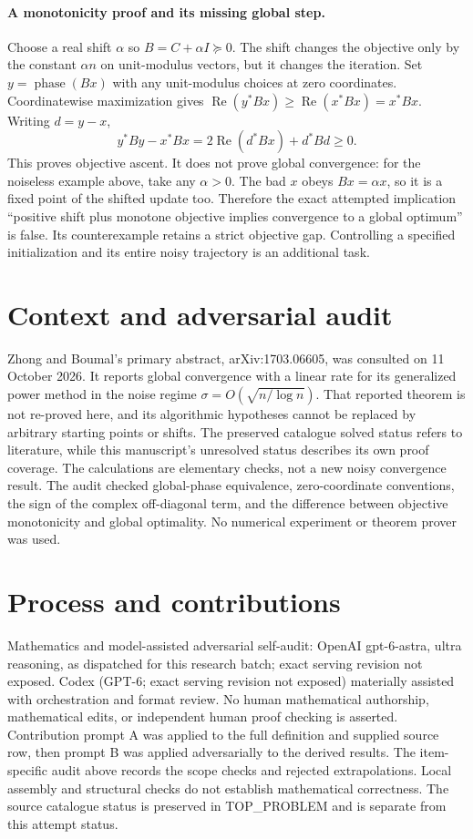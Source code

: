 \documentclass[11pt]{article}
\begin{document}
\paragraph{A monotonicity proof and its missing global step.}
Choose a real shift $\alpha$ so $B=C+\alpha I\succeq0$. The shift changes
the objective only by the constant $\alpha n$ on unit-modulus vectors,
but it changes the iteration. Set $y=\operatorname{phase}(Bx)$ with any
unit-modulus choices at zero coordinates. Coordinatewise maximization gives
$\operatorname{Re}(y^*Bx)\ge\operatorname{Re}(x^*Bx)=x^*Bx$.
Writing $d=y-x$,
\[
y^*By-x^*Bx=2\operatorname{Re}(d^*Bx)+d^*Bd\ge0.
\]
This proves objective ascent. It does not prove global convergence:
for the noiseless example above, take any $\alpha>0$. The bad $x$ obeys
$Bx=\alpha x$, so it is a fixed point of the shifted update too.
Therefore the exact attempted implication ``positive shift plus monotone
objective implies convergence to a global optimum'' is false. Its
counterexample retains a strict objective gap. Controlling a specified
initialization and its entire noisy trajectory is an additional task.

\section{Context and adversarial audit}
Zhong and Boumal's primary abstract, arXiv:1703.06605, was consulted on
11 October 2026. It reports global convergence with a linear rate for its
generalized power method in the noise regime
$\sigma=O(\sqrt{n/\log n})$. That reported theorem is not re-proved here,
and its algorithmic hypotheses cannot be replaced by arbitrary starting
points or shifts. The preserved catalogue solved status refers to literature,
while this manuscript's unresolved status describes its own proof coverage.
The calculations are elementary checks, not a new noisy convergence result.
The audit checked global-phase equivalence, zero-coordinate conventions,
the sign of the complex off-diagonal term, and the difference between
objective monotonicity and global optimality. No numerical experiment or
theorem prover was used.

\section{Process and contributions}
Mathematics and model-assisted adversarial self-audit: OpenAI gpt-6-astra, ultra reasoning, as dispatched for this research batch; exact serving revision not exposed. Codex (GPT-6; exact serving revision not exposed) materially assisted with orchestration and format review. No human mathematical authorship, mathematical edits, or independent human proof checking is asserted.
Contribution prompt A was applied to the full definition and supplied source row, then prompt B was applied adversarially to the derived results. The item-specific audit above records the scope checks and rejected extrapolations. Local assembly and structural checks do not establish mathematical correctness. The source catalogue status is preserved in TOP\_PROBLEM and is separate from this attempt status.
\end{document}

